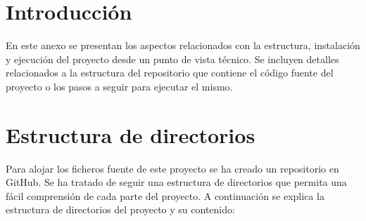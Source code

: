 
\section{Introducción}

En este anexo se presentan los aspectos relacionados con la estructura, instalación y ejecución del proyecto desde un punto de vista técnico.
Se incluyen detalles relacionados a la estructura del repositorio que contiene el código fuente del proyecto o los pasos a seguir para ejecutar el mismo.

\section{Estructura de directorios}

Para alojar los ficheros fuente de este proyecto se ha creado un repositorio en GitHub\cite{repositorio}. 
Se ha tratado de seguir una estructura de directorios que permita una fácil comprensión de cada parte del proyecto.
A continuación se explica la estructura de directorios del proyecto y su contenido:

